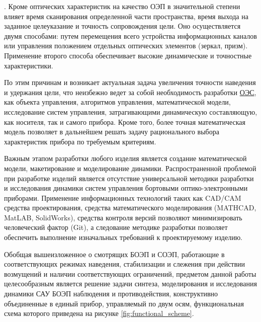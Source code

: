 \begin{comment}
Проведена оценка точности при использовании различных датчиков.Исследование влияния точности и принципа работы датчика проводится в главе \ref{ch:ch5} (\nameref{ch:ch5}).
\end{comment}

. Кроме оптических характеристик на качество ОЭП в значительной степени влияет время сканирования определенной части пространства, время выхода на заданное целеуказание и точность сопровождения цели. Оно осуществляется двумя способами: путем перемещения всего устройства информационных каналов или управления положением отдельных оптических элементов (зеркал, призм). Применение второго способа обеспечивает высокие динамические и точностные характеристики. 

По этим причинам и возникает актуальная задача увеличения точности наведения и удержания цели, что неизбежно ведет за собой необходимость разработки \hyperref[acroEOS]{ОЭС}, как объекта управления, алгоритмов управления, математической модели, исследование систем управления, затрагивающими динамическую составляющую, как носителя, так и самого прибора. Кроме того, более точная математическая модель позволяет в дальнейшем решать задачу рационального выбора характеристик прибора по требуемым критериям.
 
Важным этапом разработки любого изделия является создание математической модели, макетирование и моделирование динамики. Распространенной проблемой при разработке изделий является отсутствие универсальной методики разработки и исследования динамики систем управления бортовыми оптико-электронными приборами. Применение информационных технологий таких как CAD/CAM средства проектирования, средства математического моделирования (MATHCAD, MatLAB, SolidWorks), средства контроля версий позволяют минимизировать человеческий фактор (Git), а следование методике разработки позволяет обеспечить выполнение изначальных требований к проектируемому изделию. 

Обобщая вышеизложенное о смотрящих БОЭП и  СОЭП, работающие в соответствующих режимах наведения, стабилизации и слежения при действии возмущений и наличии соответствующих ограничений, предметом данной работы целесообразным является решение задачи синтеза, моделирования и исследования динамики САУ БОЭП наблюдения и противодействия, конструктивно объединенные в единый прибор, управляемый по двум осям, функциональная схема которого приведена на рисунке \ref{fig:functional_scheme}.


